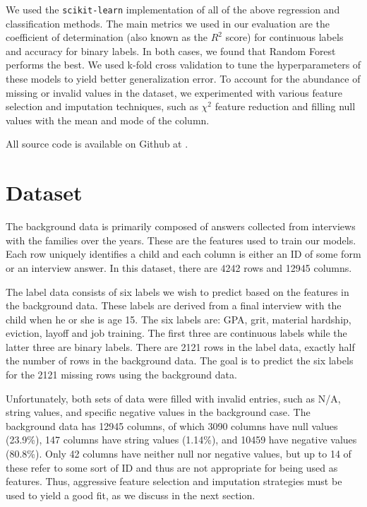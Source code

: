 \documentclass{article} %
\begin{document}
We used the \texttt{scikit-learn} \cite{scikitlearn} implementation of all of the above regression and classification methods. The main metrics we used in our evaluation are the coefficient of determination (also known as the $R^2$ score) for continuous labels and accuracy for binary labels. In both cases, we found that Random Forest performs the best. We used k-fold cross validation to tune the hyperparameters of these models to yield better generalization error. To account for the abundance of missing or invalid values in the dataset, we experimented with various feature selection and imputation techniques, such as $\chi^2$ feature reduction and filling null values with the mean and mode of the column.

All source code is available on Github at \cite{myrepo}.

\section{Dataset}
\label{sec:dataset}

The background data is primarily composed of answers collected from interviews with the families over the years. These are the features used to train our models. Each row uniquely identifies a child and each column is either an ID of some form or an interview answer. In this dataset, there are 4242 rows and 12945 columns.

The label data consists of six labels we wish to predict based on the features in the background data. These labels are derived from a final interview with the child when he or she is age 15. The six labels are: GPA, grit, material hardship, eviction, layoff and job training. The first three are continuous labels while the latter three are binary labels. There are 2121 rows in the label data, exactly half the number of rows in the background data. The goal is to predict the six labels for the 2121 missing rows using the background data.

Unfortunately, both sets of data were filled with invalid entries, such as N/A, string values, and specific negative values in the background case. The background data has 12945 columns, of which 3090 columns have null values (23.9\%), 147 columns have string values (1.14\%), and 10459 have negative values (80.8\%). Only 42 columns have neither null nor negative values, but up to 14 of these refer to some sort of ID and thus are not appropriate for being used as features. Thus, aggressive feature selection and imputation strategies must be used to yield a good fit, as we discuss in the next section. 
\end{document}
